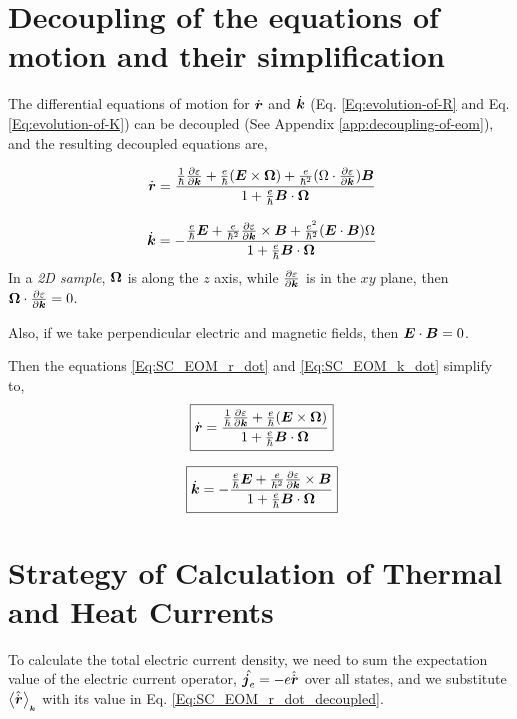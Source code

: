 \documentclass{report}
\renewcommand\vec[1]{\ensuremath\boldsymbol{#1}} %
\begin{document}
\chapter{Decoupling of the equations of motion and their simplification}

The differential equations of motion for $\dot{\vec{r}}$ and $\dot{\vec{k}}$ (Eq. \ref{Eq:evolution-of-R} and Eq. \ref{Eq:evolution-of-K}) can be decoupled (See Appendix \ref{app:decoupling-of-eom}), and the resulting decoupled equations are,

\begin{equation}~\label{Eq:SC_EOM_r_dot}
	\dot{\vec{r}} = \frac{\frac{1}{\hbar} \frac{\partial \varepsilon}{\partial \vec{k}} + \frac{e}{\hbar} (\vec{E}\times\vec{\Omega}) + \frac{e}{\hbar^2} (\Omega \cdot \frac{\partial \varepsilon}{\partial \vec{k}} )\vec{B}}{1 + \frac{e}{\hbar} \vec{B}\cdot\vec{\Omega}}
\end{equation}

\begin{equation}~\label{Eq:SC_EOM_k_dot}
	\dot{\vec{k}} = -\frac{\frac{e}{\hbar} \vec{E} +\frac{e}{\hbar^2} \frac{\partial \varepsilon}{\partial \vec{k}} \times \vec{B} + \frac{e^2}{\hbar^2} (\vec{E}\cdot\vec{B})\Omega}{1 + \frac{e}{\hbar} \vec{B}\cdot\vec{\Omega}}
\end{equation}
In a \textit{2D sample}, $\vec{\Omega}$ is along the $z$ axis, while $\frac{\partial \varepsilon}{\partial \vec{k}}$ is in the $xy$ plane, then $\vec{\Omega} \cdot \frac{\partial \varepsilon}{\partial \vec{k}} = 0$.

Also, if we take perpendicular electric and magnetic fields, then $\vec{E}\cdot \vec{B} = 0$.

Then the equations \eqref{Eq:SC_EOM_r_dot} and \eqref{Eq:SC_EOM_k_dot} simplify to,
\begin{equation}~\label{Eq:SC_EOM_r_dot_decoupled}
	\boxed{\dot{\vec{r}} = \frac{\frac{1}{\hbar} \frac{\partial \varepsilon}{\partial \vec{k}} + \frac{e}{\hbar} (\vec{E}\times\vec{\Omega})}{1 + \frac{e}{\hbar} \vec{B}\cdot\vec{\Omega}}}
\end{equation}

\begin{equation}~\label{Eq:SC_EOM_k_dot_decoupled}
	\boxed{\dot{\vec{k}} = -\frac{\frac{e}{\hbar} \vec{E} +\frac{e}{\hbar^2} \frac{\partial \varepsilon}{\partial \vec{k}} \times \vec{B}}{1 + \frac{e}{\hbar} \vec{B}\cdot\vec{\Omega}}}
\end{equation}
\chapter{Strategy of Calculation of Thermal and Heat Currents}
To calculate the total electric current density, we need to sum the expectation value of the electric current operator, $\hat{\vec{j}_e} = -e \hat{\dot{\vec{r}}}$ over all states, and we substitute $\expval{\hat{\dot{\vec{r}}}}_{_{\vec{k}}}$ with its value in Eq. \eqref{Eq:SC_EOM_r_dot_decoupled}.
\end{document}
